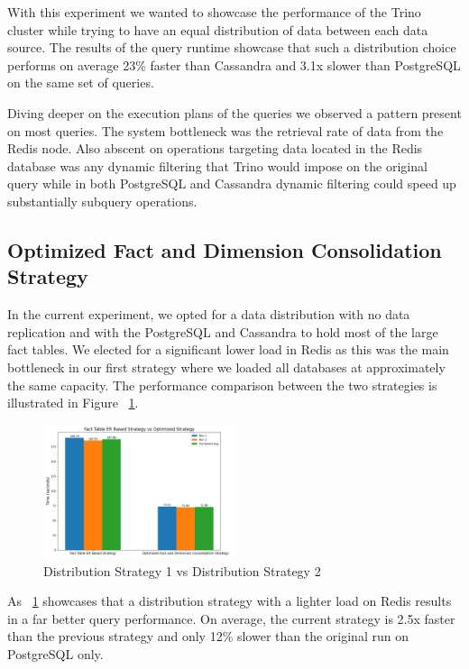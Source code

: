 \documentclass[conference]{IEEEtran}
\begin{document}
With this experiment we wanted to showcase the performance of the Trino cluster while trying to have an equal distribution of data between each data source. The results of the query runtime showcase that such a distribution choice performs on average 23\% faster than Cassandra and 3.1x slower than PostgreSQL on the same set of queries.

Diving deeper on the execution plans of the queries we observed a pattern present on most queries. The system bottleneck was the retrieval rate of data from the Redis node. Also abscent on operations targeting data located in the Redis database was any dynamic filtering that Trino would impose on the original query while in both PostgreSQL and Cassandra dynamic filtering could speed up substantially subquery operations.


\subsection{Optimized Fact and Dimension Consolidation Strategy}
\label{sec:optimized-fact-dimension-consolidation-strategy}

In the current experiment, we opted for a data distribution with no data replication and with the PostgreSQL and Cassandra to hold most of the large fact tables. We elected for a significant lower load in Redis as this was the main bottleneck in our first strategy where we loaded all databases at approximately the same capacity. The performance comparison between the two strategies is illustrated in Figure ~\ref{fig:distro1-distro2}.

\begin{figure}[h]
	\centering
	\includegraphics[width=0.5\textwidth]{images/dist1_vs_dist2/dist1_vs_dist2.png}
	\caption{Distribution Strategy 1 vs Distribution Strategy 2}
	\label{fig:distro1-distro2}
\end{figure}

As ~\ref{fig:distro1-distro2} showcases that a distribution strategy with a lighter load on Redis results in a far better query performance. On average, the current strategy is 2.5x faster than the previous strategy and only 12\% slower than the original run on PostgreSQL only.
\end{document}
